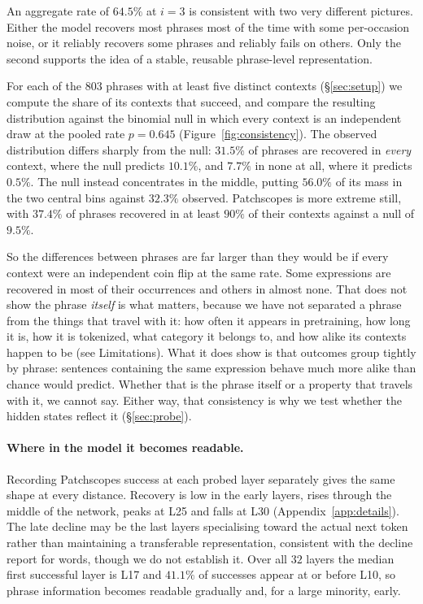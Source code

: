 An aggregate rate of $64.5\%$ at $i=3$ is consistent with two very different
pictures. Either the model recovers most phrases most of the time with some
per-occasion noise, or it reliably recovers some phrases and reliably fails on
others. Only the second supports the idea of a stable, reusable phrase-level
representation.

For each of the $803$ phrases with at least five distinct contexts
(\S\ref{sec:setup}) we compute the share of its contexts that succeed, and
compare the resulting distribution against the binomial null in which every
context is an independent draw at the pooled rate $p = 0.645$
(Figure~\ref{fig:consistency}). The observed distribution differs sharply from
the null: $31.5\%$ of phrases are recovered in \emph{every} context, where the
null predicts $10.1\%$, and $7.7\%$ in none at all, where it predicts $0.5\%$.
The null instead concentrates in the middle, putting $56.0\%$ of its mass in
the two central bins against $32.3\%$ observed. Patchscopes is more extreme
still, with $37.4\%$ of phrases recovered in at least $90\%$ of their contexts
against a null of $9.5\%$.

So the differences between phrases are far larger than they would be if every
context were an independent coin flip at the same rate. Some expressions are
recovered in most of their occurrences and others in almost none. That does not
show the phrase \emph{itself} is what matters, because we have not separated a
phrase from the things that travel with it: how often it appears in
pretraining, how long it is, how it is tokenized, what category it belongs to,
and how alike its contexts happen to be (see Limitations). What it does show is
that outcomes group tightly by phrase: sentences containing the same expression
behave much more alike than chance would predict. Whether that is the phrase
itself or a property that travels with it, we cannot say. Either way, that
consistency is why we test whether the hidden states reflect it
(\S\ref{sec:probe}).

\paragraph{Where in the model it becomes readable.}
Recording Patchscopes success at each probed layer separately gives the same
shape at every distance. Recovery is low in the early layers, rises through the
middle of the network, peaks at L25 and falls at L30 (Appendix~\ref{app:details}). The
late decline may be the last layers specialising toward the actual next token
rather than maintaining a transferable representation, consistent with the
decline \citet{kaplan-etal-2025-tokens} report for words, though we do not
establish it. Over all $32$ layers the median first successful layer is L17 and
$41.1\%$ of successes appear at or before L10, so phrase information becomes
readable gradually and, for a large minority, early.


